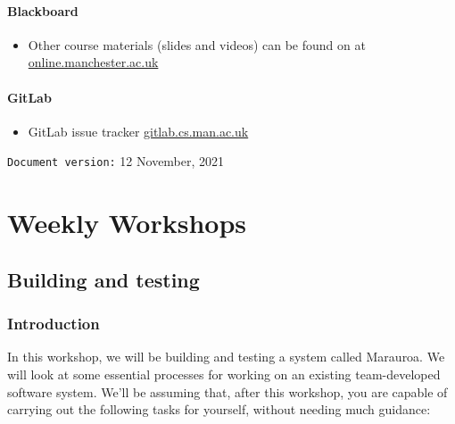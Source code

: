 \documentclass[
]{book}
\providecommand{\tightlist}{%
  \setlength{\itemsep}{0pt}\setlength{\parskip}{0pt}}
\begin{document}
\hypertarget{blackboard}{%
\subsection{Blackboard}\label{blackboard}}

\begin{itemize}
\tightlist
\item
  Other course materials (slides and videos) can be found on at \href{https://online.manchester.ac.uk/}{online.manchester.ac.uk}
\end{itemize}

\hypertarget{gitlab}{%
\subsection{GitLab}\label{gitlab}}

\begin{itemize}
\tightlist
\item
  GitLab issue tracker \href{https://gitlab.cs.man.ac.uk/}{gitlab.cs.man.ac.uk}
\end{itemize}

























\texttt{Document\ version:} 12 November, 2021

\hypertarget{part-weekly-workshops}{%
\part{Weekly Workshops}\label{part-weekly-workshops}}

\hypertarget{building}{%
\chapter{Building and testing}\label{building}}

\hypertarget{Introduction}{%
\section{Introduction}\label{Introduction}}

In this workshop, we will be building and testing a system called Marauroa. We will look at some essential processes for working on an existing team-developed software system. We'll be assuming that, after this workshop, you are capable of carrying out the following tasks for yourself, without needing much guidance:
\end{document}
